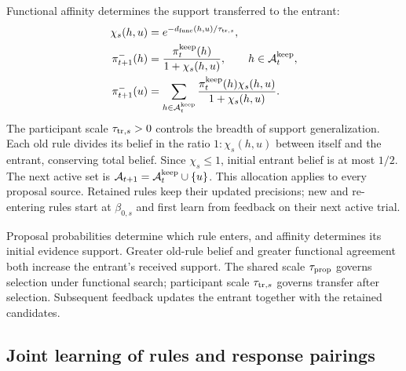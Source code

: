 Functional affinity determines the support transferred to the entrant:
\begin{align}
\chi_s(h,u)&=e^{-d_{\rm func}(h,u)/\tau_{{\rm tr},s}},\\
\pi_{t+1}^-(h)&=\frac{\pi_t^{\rm keep}(h)}{1+\chi_s(h,u)},
\qquad h\in\mathcal A_t^{\rm keep},\\
\pi_{t+1}^-(u)&=\sum_{h\in\mathcal A_t^{\rm keep}}
\frac{\pi_t^{\rm keep}(h)\chi_s(h,u)}{1+\chi_s(h,u)}.
\label{eq:belief-transfer-paper}
\end{align}
The participant scale $\tau_{{\rm tr},s}>0$ controls the breadth of support generalization. Each old rule divides its belief in the ratio $1:\chi_s(h,u)$ between itself and the entrant, conserving total belief. Since $\chi_s\leq1$, initial entrant belief is at most $1/2$. The next active set is $\mathcal A_{t+1}=\mathcal A_t^{\rm keep}\cup\{u\}$. This allocation applies to every proposal source. Retained rules keep their updated precisions; new and re-entering rules start at $\beta_{0,s}$ and first learn from feedback on their next active trial.

Proposal probabilities determine which rule enters, and affinity determines its initial evidence support. Greater old-rule belief and greater functional agreement both increase the entrant's received support. The shared scale $\tau_{\rm prop}$ governs selection under functional search; participant scale $\tau_{{\rm tr},s}$ governs transfer after selection. Subsequent feedback updates the entrant together with the retained candidates.

\subsection*{Joint learning of rules and response pairings}
\label{m:pairing}


